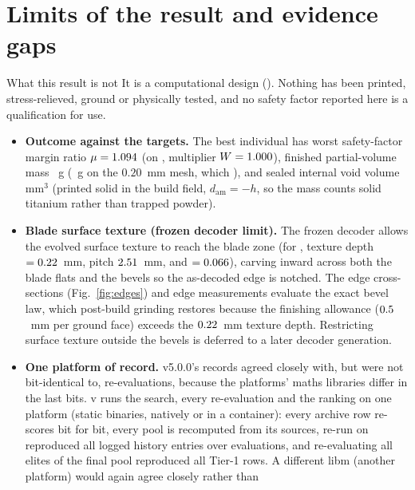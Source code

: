 \section{Limits of the result and evidence gaps}\label{sec:limits}
\begin{eibox}{What this result is not}
It is a computational design (\gStatus). Nothing has been printed, stress-relieved, ground or physically tested, and no
safety factor reported here is a qualification for use.
\end{eibox}
\begin{itemize}
\item \textbf{Outcome against the targets.} The best individual \gDesign{} has worst safety-factor margin ratio
$\mu = 1.094$ (on \gWorstMarginCase, multiplier $W = 1.000$), finished partial-volume mass \gMassFinishedG{}~g
(\gMassG{}~g on the $0.20$~mm mesh, which \gMassReading), and sealed internal void volume \gSealedVoid{}~$\mathrm{mm^3}$
(printed solid in the build field, $d_\mathrm{am} = -h$, so the mass counts solid titanium rather than trapped powder).
\item \textbf{Blade surface texture (frozen  decoder limit).} The frozen  decoder allows the evolved
surface texture to reach the blade zone (for \gDesign, texture depth  $= 0.22$~mm, pitch $2.51$~mm, and
 $= 0.066$), carving inward across both the blade flats and the bevels so the as-decoded edge is
notched. The edge cross-sections (Fig.~\ref{fig:edges}) and edge measurements evaluate the exact bevel law, which post-build
grinding restores because the  finishing allowance ($0.5$~mm per ground face) exceeds the
$0.22$~mm texture depth. Restricting surface texture outside the bevels is deferred to a later decoder generation.
\item \textbf{One platform of record.} v5.0.0's  records agreed closely with, but were not bit-identical to,
 re-evaluations, because the platforms' maths libraries differ in the last bits. v\gRecord{} runs the search, every
re-evaluation and the ranking on one platform (static  binaries, natively or in a  container): every archive
row re-scores bit for bit, every pool is recomputed from its sources, \gReproIsland{} re-run on \gReproHost{} reproduced all
\gReproEntries{} logged history entries over \gReproEvals{} evaluations, and re-evaluating all \gCohortElites{} elites of the final
pool reproduced all \gTierOneReproduced{} Tier-1 rows. A different libm (another platform) would again agree closely rather than

\end{itemize}
